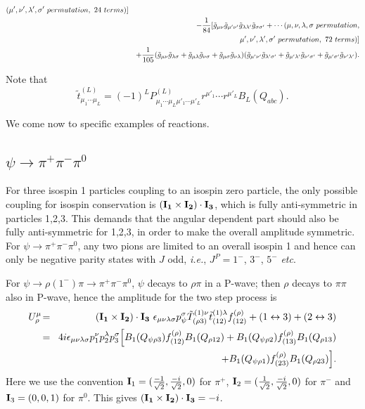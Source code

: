 \begin{eqnarray}
 (\mu', \nu', \lambda', \sigma' ~permutation, ~24~terms)] \nonumber\\
& & -{1\over 84}[\tilde{g}_{\mu\nu}\tilde{g}_{\mu'\nu'}
\tilde{g}_{\lambda\lambda'}\tilde{g}_{\sigma\sigma'}+\cdots
 (\mu, \nu, \lambda, \sigma~permutation, \nonumber\\
& & \quad\quad\quad\quad\quad ~\mu', \nu', \lambda', \sigma'
~permutation, ~72~terms)] \nonumber\\
& & +{1\over 105}(\tilde{g}_{\mu\nu}\tilde{g}_{\lambda\sigma} +
\tilde{g}_{\mu\lambda}\tilde{g}_{\nu\sigma} +
\tilde{g}_{\mu\sigma}\tilde{g}_{\nu\lambda})
(\tilde{g}_{\mu'\nu'}\tilde{g}_{\lambda'\sigma'} +
\tilde{g}_{\mu'\lambda'}\tilde{g}_{\nu'\sigma'} +
\tilde{g}_{\mu'\sigma'}\tilde{g}_{\nu'\lambda'}). \nonumber\\
\end{eqnarray}

Note that
\begin{equation}
\tilde t^{(L)}_{\mu_1\cdots\mu_L}
=(-1)^LP^{(L)}_{\mu_1\cdots\mu_L\mu'_1\cdots\mu'_L}r^{\mu'_1}\cdots
r^{\mu'_L}B_L(Q_{abc}).
\end{equation}

We come now to specific examples of reactions.

\subsection{$\psi\to\pi^+\pi^-\pi^0$}
For three isospin 1 particles coupling to an isospin zero
particle, the only possible coupling for isospin conservation is
$\bf (I_1\times I_2)\cdot I_3$, which is fully anti-symmetric in
particles  1,2,3. This demands that the angular dependent part
should also be fully anti-symmetric for 1,2,3, in order to make
the overall amplitude symmetric. For $\psi\to\pi^+\pi^-\pi^0$, any
two pions are limited to an overall isospin 1 and hence can only
be negative parity states with $J$ odd, {\sl i.e.}, $J^P=1^-$,
$3^-$, $5^-$ {\sl etc}.

For $\psi\to\rho(1^-)\pi\to\pi^+\pi^-\pi^0$, $\psi$ decays to
$\rho\pi$ in a P-wave; then $\rho$ decays to $\pi\pi$ also in
P-wave, hence the amplitude for the two step process is
\begin{eqnarray}
U_\rho^\mu \!&=&\! {\bf (I_1\times I_2)\cdot I_3}
~\epsilon_{\mu\nu\lambda\sigma}p_\psi^\sigma \tilde
T^{(1)\nu}_{(\rho 3)}\tilde t^{(1)\lambda}_{(12)}
f^{(\rho)}_{(12)} + (1\leftrightarrow 3) +
(2\leftrightarrow 3) \nonumber\\
&=&\! 4i\epsilon_{\mu\nu\lambda\sigma}p_1^\nu p_2^\lambda
p_3^\sigma \Bigl[B_1(Q_{\psi\rho 3}) f^{(\rho)}_{(12)}B_1(Q_{\rho
12}) +
B_1(Q_{\psi\rho 2}) f^{(\rho)}_{(13)} B_1(Q_{\rho 13}) \nonumber\\
& &\quad\quad\quad + B_1(Q_{\psi\rho 1}) f^{(\rho)}_{(23)}
B_1(Q_{\rho 23})\Bigr].
\end{eqnarray}
Here we use the convention ${\bf I}_1=({-1\over\sqrt{2}},
{-i\over\sqrt{2}},0)$ for $\pi^+$, ${\bf I}_2=({1\over\sqrt{2}},
{-i\over\sqrt{2}},0)$ for $\pi^-$ and ${\bf I}_3 = (0, 0, 1)$ for
$\pi^0$. This gives ${\bf (I_1\times I_2)\cdot I_3}=-i$.


